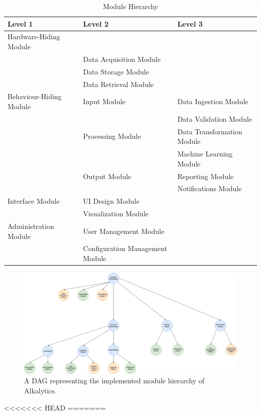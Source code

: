 \documentclass[12pt, titlepage]{article}
\begin{document}
\begin{table}[h!]
\centering
\begin{tabular}{p{} p{} p{}}
\toprule
\textbf{Level 1} & \textbf{Level 2} & \textbf{Level 3}\\
\midrule

{Hardware-Hiding Module} & ~ & ~ \\
& Data Acquisition Module & \\
& Data Storage Module & \\
& Data Retrieval Module & \\
\midrule

{Behaviour-Hiding Module} & Input Module & Data Ingestion Module\\
& & Data Validation Module\\
& Processing Module & Data Transformation Module\\
& & Machine Learning Module\\
& Output Module & Reporting Module\\
& & Notifications Module\\
\midrule

{Interface Module} & UI Design Module & \\
& Visualization Module & \\
\midrule

{Administration Module} & User Management Module & \\
& Configuration Management Module & \\
\bottomrule

\end{tabular}
\caption{Module Hierarchy}
\label{TblMH}
\end{table}

\begin{figure}[htbp]
  \centering
  \includegraphics[width=\textwidth]{Diagrams/DAG.png}
  \caption{A DAG representing the implemented module hierarchy of Alkalytics.}
  \label{fig:FigMH}
\end{figure}
<<<<<<< HEAD
=======
\end{document}
